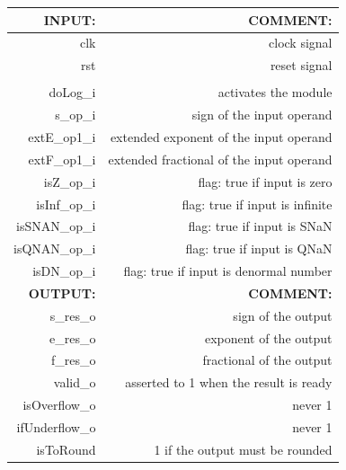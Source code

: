 \documentclass{report}
\begin{document}
\begin{table}[htbp]
\begin{tabular}{|r|r|} 
\hline
\textbf{INPUT:}  & \textbf{COMMENT:}                          \\ 
\hline
clk              & clock signal                              \\ 
\hline
rst              & reset signal                              \\ 
\hline
                 &                                           \\ 
\hline
doLog\_i         & activates the module                      \\ 
\hline
s\_op\_i         & sign of the input operand                 \\ 
\hline
extE\_op1\_i     & extended exponent of the input operand    \\ 
\hline
extF\_op1\_i     & extended fractional of the input operand  \\ 
\hline
isZ\_op\_i       & flag: true if input is zero               \\ 
\hline
isInf\_op\_i     & flag: true if input is infinite           \\ 
\hline
isSNAN\_op\_i    & flag: true if input is SNaN               \\ 
\hline
isQNAN\_op\_i    & flag: true if input is QNaN               \\ 
\hline
isDN\_op\_i      & flag: true if input is denormal number    \\ 
\hline
\hline
\textbf{OUTPUT:} &    \textbf{COMMENT:}                                       \\ 
\hline
s\_res\_o        & sign of the output                        \\ 
\hline
e\_res\_o        & exponent of the output                    \\ 
\hline
f\_res\_o        & fractional of the output                  \\ 
\hline
valid\_o         & asserted to 1 when the result is ready    \\ 
\hline
isOverflow\_o    & never 1                                   \\ 
\hline
ifUnderflow\_o   & never 1                                   \\ 
\hline
isToRound        & 1 if the output must be rounded           \\
\hline
\end{tabular}
\end{table}
\end{document}
